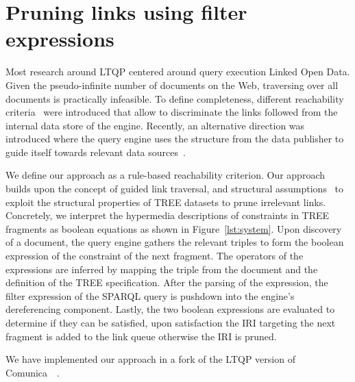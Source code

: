 \section{Pruning links using filter expressions}



Most research around LTQP centered around query execution Linked Open Data.
Given the pseudo-infinite number of documents on the Web, traversing over all documents is practically infeasible.
To define completeness, different reachability criteria~\cite{hartig2012} were introduced that allow to discriminate the links followed from the internal data store of the engine.
Recently, an alternative direction was introduced where the query engine uses the structure from the data publisher to guide itself towards relevant data sources~\cite{taelman2023, verborgh2020}.

We define our approach as a rule-based reachability criterion.
Our approach builds upon the concept of guided link traversal, and structural assumptions~\cite{taelman2023} to exploit the structural properties of TREE datasets to prune irrelevant links.
Concretely, we interpret the hypermedia descriptions of constraints in TREE fragments as boolean equations as shown in Figure~\ref{lst:system}.
Upon discovery of a document, the query engine gathers the relevant triples to form the boolean expression of the constraint of the next fragment.
The operators of the expressions are inferred by mapping the triple from the document and the definition of the TREE specification.
After the parsing of the expression, the filter expression of the SPARQL query is pushdown into the engine's dereferencing component.
Lastly, the two boolean expressions are evaluated to determine if they can be satisfied, upon satisfaction the IRI targeting the next fragment is added to the link queue otherwise the IRI is pruned.

We have implemented our approach in a fork of the LTQP version of Comunica~\cite{comunica}~.

